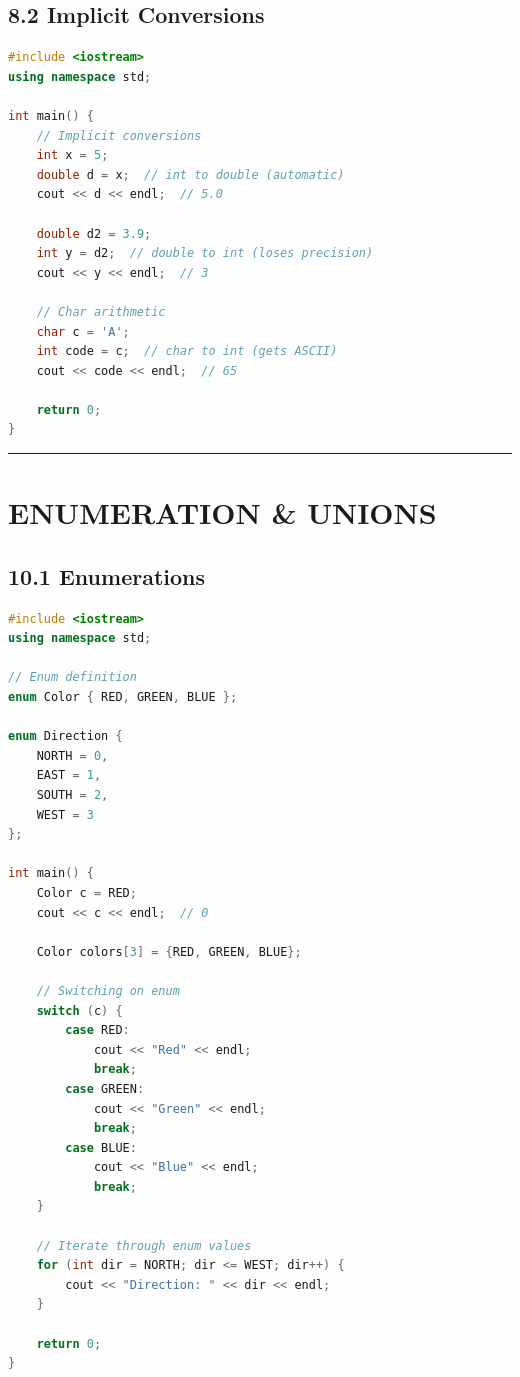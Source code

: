 \hypertarget{implicit-conversions}{%
\subsection{8.2 Implicit Conversions}\label{implicit-conversions}}

\begin{lstlisting}[language={C++}]
#include <iostream>
using namespace std;

int main() {
    // Implicit conversions
    int x = 5;
    double d = x;  // int to double (automatic)
    cout << d << endl;  // 5.0

    double d2 = 3.9;
    int y = d2;  // double to int (loses precision)
    cout << y << endl;  // 3

    // Char arithmetic
    char c = 'A';
    int code = c;  // char to int (gets ASCII)
    cout << code << endl;  // 65

    return 0;
}
\end{lstlisting}

\begin{center}\rule{0.5\linewidth}{0.5pt}\end{center}

\hypertarget{enumeration-unions}{%
\section{ENUMERATION \& UNIONS}\label{enumeration-unions}}

\hypertarget{enumerations}{%
\subsection{10.1 Enumerations}\label{enumerations}}

\begin{lstlisting}[language={C++}]
#include <iostream>
using namespace std;

// Enum definition
enum Color { RED, GREEN, BLUE };

enum Direction {
    NORTH = 0,
    EAST = 1,
    SOUTH = 2,
    WEST = 3
};

int main() {
    Color c = RED;
    cout << c << endl;  // 0

    Color colors[3] = {RED, GREEN, BLUE};

    // Switching on enum
    switch (c) {
        case RED:
            cout << "Red" << endl;
            break;
        case GREEN:
            cout << "Green" << endl;
            break;
        case BLUE:
            cout << "Blue" << endl;
            break;
    }

    // Iterate through enum values
    for (int dir = NORTH; dir <= WEST; dir++) {
        cout << "Direction: " << dir << endl;
    }

    return 0;
}
\end{lstlisting}

